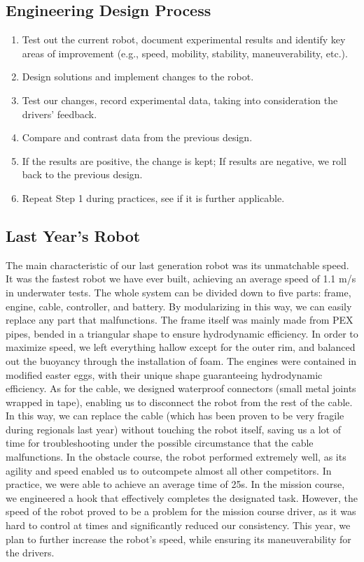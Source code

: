 \documentclass[11pt, oneside]{article}   	%
\begin{document}
\subsection{Engineering Design Process}
\begin{enumerate}
	\item Test out the current robot, document experimental results and identify key areas of improvement (e.g., speed, mobility, stability, maneuverability, etc.).
	\item Design solutions and implement changes to the robot.
	\item Test our changes, record experimental data, taking into consideration the drivers’ feedback.
	\item Compare and contrast data from the previous design.
	\item If the results are positive, the change is kept; If results are negative, we roll back to the previous design.
	\item Repeat Step 1 during practices, see if it is further applicable.
\end{enumerate}

\subsection{Last Year's Robot}
The main characteristic of our last generation robot was its unmatchable speed. It was the fastest robot we have ever built, achieving an average speed of 1.1 m/s in underwater tests. The whole system can be divided down to five parts: frame, engine, cable, controller, and battery. By modularizing in this way, we can easily replace any part that malfunctions. The frame itself was mainly made from PEX pipes, bended in a triangular shape to ensure hydrodynamic efficiency. In order to maximize speed, we left everything hallow except for the outer rim, and balanced out the buoyancy through the installation of foam. The engines were contained in modified easter eggs, with their unique shape guaranteeing hydrodynamic efficiency. As for the cable, we designed waterproof connectors (small metal joints wrapped in tape), enabling us to disconnect the robot from the rest of the cable. In this way, we can replace the cable (which has been proven to be very fragile during regionals last year) without touching the robot itself, saving us a lot of time for troubleshooting under the possible circumstance that the cable malfunctions.
In the obstacle course, the robot performed extremely well, as its agility and speed enabled us to outcompete almost all other competitors. In practice, we were able to achieve an average time of 25s. In the mission course, we engineered a hook that effectively completes the designated task. However, the speed of the robot proved to be a problem for the mission course driver, as it was hard to control at times and significantly reduced our consistency. This year, we plan to further increase the robot’s speed, while ensuring its maneuverability for the drivers.
\end{document}
